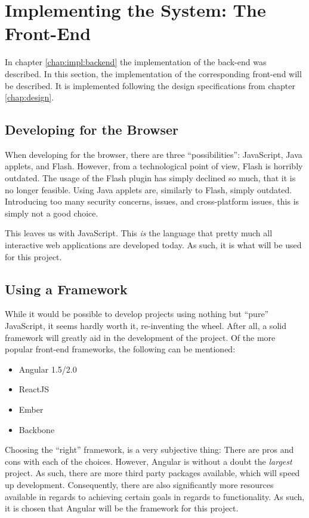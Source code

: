 \chapter{Implementing the System: The Front-End}
	In chapter \ref{chap:impl:backend} the implementation of the back-end was described. In this section, the implementation of the corresponding front-end will be described. It is implemented following the design specifications from chapter \ref{chap:design}.

	\section{Developing for the Browser}
		When developing for the browser, there are three ``possibilities'': JavaScript, Java applets, and Flash. However, from a technological point of view, Flash is horribly outdated. The usage of the Flash plugin has simply declined so much, that it is no longer feasible. Using Java applets are, similarly to Flash, simply outdated. Introducing too many security concerns, issues, and cross-platform issues, this is simply not a good choice.

		This leaves us with JavaScript. This \emph{is} the language that pretty much all interactive web applications are developed today. As such, it is what will be used for this project.


	\section{Using a Framework}
		While it would be possible to develop projects using nothing but ``pure'' JavaScript, it seems hardly worth it, re-inventing the wheel. After all, a solid framework will greatly aid in the development of the project. Of the more popular front-end frameworks, the following can be mentioned:
		\begin{itemize}
			\item Angular 1.5/2.0
			\item ReactJS
			\item Ember
			\item Backbone
		\end{itemize}
		Choosing the ``right'' framework, is a very subjective thing: There are pros and cons with each of the choices. However, Angular is without a doubt the \emph{largest} project. As such, there are more third party packages available, which will speed up development. Consequently, there are also significantly more resources available in regards to achieving certain goals in regards to functionality. As such, it is chosen that Angular will be the framework for this project.



